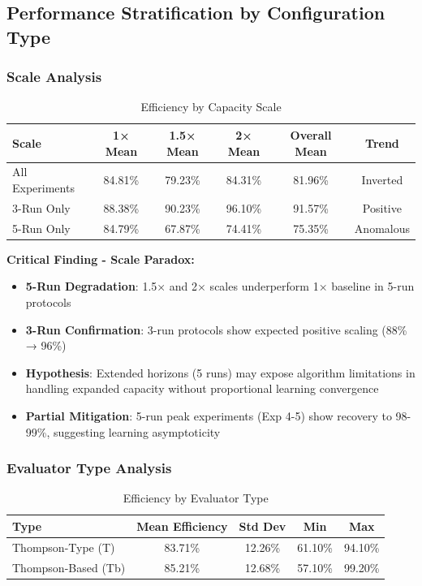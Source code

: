 \documentclass[12pt,a4paper]{article}
\newcommand{\primarytext}[1]{\textcolor{primaryblue}{\textbf{#1}}}
\newcommand{\secondarytext}[1]{\textcolor{secondaryblue}{\textbf{#1}}}
\newcommand{\success}[1]{\textcolor{accentgreen}{\textbf{#1}}}
\newcommand{\warning}[1]{\textcolor{warningred}{\textbf{#1}}}
\begin{document}
\subsection{Performance Stratification by Configuration Type}

\subsubsection{Scale Analysis}

\begin{table}[H]
\centering
\caption{Efficiency by Capacity Scale}
\begin{tabular}{@{}lccccc@{}}
\toprule
\textbf{Scale} & \textbf{1× Mean} & \textbf{1.5× Mean} & \textbf{2× Mean} & \textbf{Overall Mean} & \textbf{Trend} \\
\midrule
All Experiments & 84.81\% & 79.23\% & 84.31\% & 81.96\% & Inverted \\
3-Run Only & 88.38\% & 90.23\% & 96.10\% & 91.57\% & Positive \\
5-Run Only & 84.79\% & 67.87\% & 74.41\% & 75.35\% & Anomalous \\
\bottomrule
\end{tabular}
\end{table}

\textbf{Critical Finding - Scale Paradox:}
\begin{itemize}
\item \warning{5-Run Degradation}: 1.5× and 2× scales underperform 1× baseline in 5-run protocols
\item \primarytext{3-Run Confirmation}: 3-run protocols show expected positive scaling (88\% → 96\%)
\item \secondarytext{Hypothesis}: Extended horizons (5 runs) may expose algorithm limitations in handling expanded capacity without proportional learning convergence
\item \success{Partial Mitigation}: 5-run peak experiments (Exp 4-5) show recovery to 98-99\%, suggesting learning asymptoticity
\end{itemize}

\subsubsection{Evaluator Type Analysis}

\begin{table}[H]
\centering
\caption{Efficiency by Evaluator Type}
\begin{tabular}{@{}lcccc@{}}
\toprule
\textbf{Type} & \textbf{Mean Efficiency} & \textbf{Std Dev} & \textbf{Min} & \textbf{Max} \\
\midrule
Thompson-Type (T) & 83.71\% & 12.26\% & 61.10\% & 94.10\% \\
Thompson-Based (Tb) & 85.21\% & 12.68\% & 57.10\% & 99.20\% \\
\bottomrule
\end{tabular}
\end{table}
\end{document}
